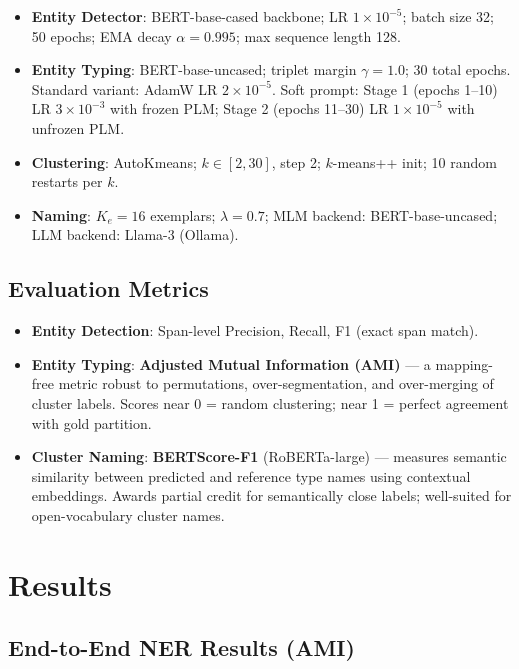\documentclass[11pt,a4paper]{article}
\begin{document}
\begin{itemize}[noitemsep]
  \item \textbf{Entity Detector}: BERT-base-cased backbone; LR $1{\times}10^{-5}$; batch size 32; 50 epochs; EMA decay $\alpha=0.995$; max sequence length 128.
  \item \textbf{Entity Typing}: BERT-base-uncased; triplet margin $\gamma=1.0$; 30 total epochs. Standard variant: AdamW LR $2{\times}10^{-5}$. Soft prompt: Stage 1 (epochs 1–10) LR $3{\times}10^{-3}$ with frozen PLM; Stage 2 (epochs 11–30) LR $1{\times}10^{-5}$ with unfrozen PLM.
  \item \textbf{Clustering}: AutoKmeans; $k \in [2, 30]$, step 2; $k$-means++ init; 10 random restarts per $k$.
  \item \textbf{Naming}: $K_e=16$ exemplars; $\lambda=0.7$; MLM backend: BERT-base-uncased; LLM backend: Llama-3 (Ollama).
\end{itemize}

\subsection{Evaluation Metrics}

\begin{itemize}[noitemsep]
  \item \textbf{Entity Detection}: Span-level Precision, Recall, F1 (exact span match).
  \item \textbf{Entity Typing}: \textbf{Adjusted Mutual Information (AMI)} — a mapping-free metric robust to permutations, over-segmentation, and over-merging of cluster labels. Scores near 0 = random clustering; near 1 = perfect agreement with gold partition.
  \item \textbf{Cluster Naming}: \textbf{BERTScore-F1} (RoBERTa-large) — measures semantic similarity between predicted and reference type names using contextual embeddings. Awards partial credit for semantically close labels; well-suited for open-vocabulary cluster names.
\end{itemize}

\section{Results}

\subsection{End-to-End NER Results (AMI)}
\end{document}
